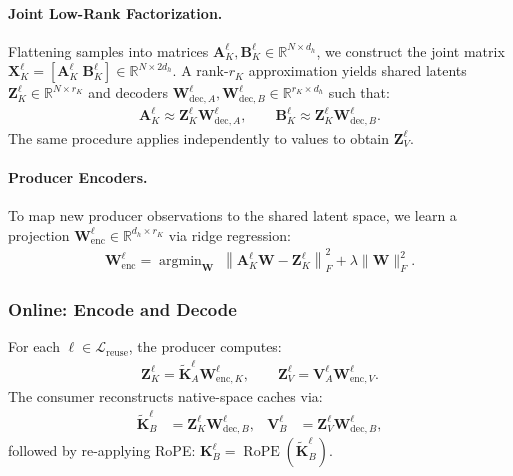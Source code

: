 \documentclass{article}
\theoremstyle{plain}
\theoremstyle{definition}
\theoremstyle{remark}
\begin{document}
\paragraph{Joint Low-Rank Factorization.}
Flattening samples into matrices $\mathbf{A}_K^\ell, \mathbf{B}_K^\ell \in \mathbb{R}^{N \times d_h}$, we construct the joint matrix $\mathbf{X}_K^\ell = [\mathbf{A}_K^\ell \; \mathbf{B}_K^\ell] \in \mathbb{R}^{N \times 2d_h}$.
A rank-$r_K$ approximation yields shared latents $\mathbf{Z}_K^\ell \in \mathbb{R}^{N \times r_K}$ and decoders $\mathbf{W}_{\mathrm{dec}, A}^\ell, \mathbf{W}_{\mathrm{dec}, B}^\ell \in \mathbb{R}^{r_K \times d_h}$ such that:
\begin{align}
\mathbf{A}_K^\ell \approx \mathbf{Z}_K^\ell \mathbf{W}_{\mathrm{dec}, A}^\ell, \qquad
\mathbf{B}_K^\ell \approx \mathbf{Z}_K^\ell \mathbf{W}_{\mathrm{dec}, B}^\ell.
\label{eq:joint_decoder_K}
\end{align}
The same procedure applies independently to values to obtain $\mathbf{Z}_V^\ell$.

\paragraph{Producer Encoders.}
To map new producer observations to the shared latent space, we learn a projection $\mathbf{W}_{\mathrm{enc}}^\ell \in \mathbb{R}^{d_h \times r_K}$ via ridge regression:
\begin{align}
\mathbf{W}_{\mathrm{enc}}^\ell
= \mathop{\arg\min}_{\mathbf{W}} \; \left\| \mathbf{A}_K^\ell \mathbf{W} - \mathbf{Z}_K^\ell \right\|_F^2 + \lambda \|\mathbf{W}\|_F^2.
\label{eq:ridge_encoder}
\end{align}

\subsubsection{Online: Encode and Decode}
\label{subsec:reuse_online}

For each $\ell \in \mathcal{L}_{\mathrm{reuse}}$, the producer computes:
\begin{align}
\mathbf{Z}_K^\ell = \tilde{\mathbf{K}}_A^\ell \mathbf{W}_{\mathrm{enc}, K}^\ell,
\qquad
\mathbf{Z}_V^\ell = \mathbf{V}_A^\ell \mathbf{W}_{\mathrm{enc}, V}^\ell.
\label{eq:encode_z_kv}
\end{align}
The consumer reconstructs native-space caches via:
\begin{align}
\tilde{\mathbf{K}}_{B}^\ell &= \mathbf{Z}_K^\ell \mathbf{W}_{\mathrm{dec}, B}^\ell,
&
\mathbf{V}_{B}^\ell &= \mathbf{Z}_V^\ell \mathbf{W}_{\mathrm{dec}, B}^\ell,
\label{eq:decode_kv}
\end{align}
followed by re-applying RoPE: $\mathbf{K}_{B}^\ell = \operatorname{RoPE}(\tilde{\mathbf{K}}_{B}^\ell)$.
\end{document}
